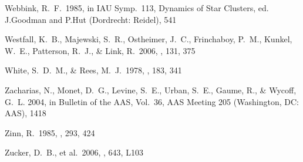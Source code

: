 \documentclass{emulateapj}
\begin{document}
\begin{thebibliography}{}


 Webbink, R.~F.\ 1985, in IAU
  Symp.\ 113, Dynamics of Star Clusters, ed. J.Goodman and P.Hut
  (Dordrecht: Reidel), 541

 Westfall, K.~B., Majewski,
  S.~R., Ostheimer, J.~C., Frinchaboy, P.~M., Kunkel, W.~E.,
  Patterson, R.~J., \& Link, R.\ 2006, \aj, 131, 375

 White, S.~D.~M., \& Rees,
  M.~J.\ 1978, \mnras, 183, 341



 Zacharias, N., Monet, D.~G.,
  Levine, S.~E., Urban, S.~E., Gaume, R., \& Wycoff, G.~L. 2004, in
  Bulletin of the AAS, Vol.~36, AAS Meeting 205 (Washington, DC: AAS),
  1418

 Zinn, R.\ 1985, \apj, 293, 424

 Zucker, D.~B., et al.\ 2006,
  \apjl, 643, L103

\end{thebibliography}
\end{document}

